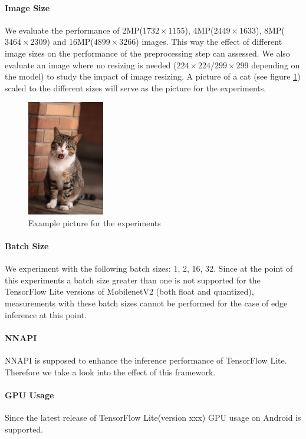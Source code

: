 \paragraph{Image Size}
We evaluate the performance of 2MP($1732\times1155$), 4MP($2449\times1633$), 8MP($3464\times2309$) and 16MP($4899\times3266$) images. This way the effect of different image sizes on the performance of the preprocessing step can assessed. We also evaluate an image where no resizing is needed ($224\times224$/$299\times299$ depending on the model) to study the impact of image resizing. A picture of a cat (see figure \ref{fig:cat}) scaled to the different sizes will serve as the picture for the experiments.
\begin{figure}[H]
\centering
\includegraphics[width=0.3\textwidth]{./Bilder/European_cat_02_16_mp.jpg}
\caption{Example picture for the experiments \cite{cat}}
\label{fig:cat}
\end{figure}
\paragraph{Batch Size}
We experiment with the following batch sizes: 1, 2, 16, 32. Since at the point of this experiments a batch size greater than one is not supported for the TensorFlow Lite versions of MobilenetV2 (both float and quantized), measurements with these batch sizes cannot be performed for the case of edge inference at this point.
\paragraph{NNAPI}
NNAPI is supposed to enhance the inference performance of TensorFlow Lite. Therefore we take a look into the effect of this framework.
\paragraph{GPU Usage}
Since the latest release of TensorFlow Lite(version xxx) GPU usage on Android is supported.
